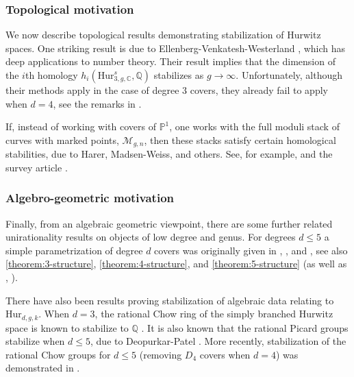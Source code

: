 \documentclass[12 pt]{amsart}
\theoremstyle{plain}
\theoremstyle{definition}
\theoremstyle{remark}
\numberwithin{equation}{section}
\newcommand\bc{\mathbb C}
\newcommand\bp{\mathbb P}
\newcommand\bq{\mathbb Q}
\newcommand\hur[3]{\mathrm{Hur}_{#1,#2,#3}} %
\newcommand\rhur[4]{\mathrm{Hur}_{#1,#2,#3}^{#4}} %
\begin{document}
\subsubsection{Topological motivation}

We now describe topological results demonstrating stabilization of Hurwitz
spaces.
One striking result is due to Ellenberg-Venkatesh-Westerland \cite{EllenbergVW:cohenLenstra}, which has 
deep applications to number theory.
Their result \cite[Thm.\, p. 732]{EllenbergVW:cohenLenstra}
implies that the dimension of the $i$th homology $h_i(\rhur 3 g \bc s, \bq)$
stabilizes as $g \to \infty$.
Unfortunately, although their methods apply in the case of degree $3$ covers,
they already fail to apply when $d= 4$, see the remarks in
\cite[p. 732]{EllenbergVW:cohenLenstra}.

If, instead of working with covers of $\bp^1$, one
works with the full moduli stack of curves with marked points, $\mathcal M_{g,n}$,
then these stacks satisfy certain homological stabilities, due to Harer,
Madsen-Weiss, and others. See, for example,
\cite{madsen-weiss:the-stable-moduli-space-of-riemann-surfaces} and
the survey article
\cite{hatcher:a-short-exposition}.



\subsubsection{Algebro-geometric motivation}

Finally, from an algebraic geometric viewpoint, there are some further related
unirationality results on objects of low degree and genus.
For degrees $d \leq 5$ a simple parametrization of degree $d$ covers
was originally given in \cite[Thm.\ 1.1]{miranda:triple-covers-in-algebraic-geometry},
\cite[ Thm.\ 4.4]{casnatiE:covers-algebraic-varieties}, and \cite[Thm.\
3.8]{casnati:covers-algebraic-varieties-ii},
see also
\autoref{theorem:3-structure},
\autoref{theorem:4-structure}, and
\autoref{theorem:5-structure} (as well as \cite[Prop.\ 5.1]{Poonen2008},
\cite[Thm.\ 1.1]{Wood2011}).

There have also been results proving stabilization 
of algebraic data relating to $\hur d g k$.
When $d = 3$, the rational Chow ring of the simply branched Hurwitz space
is known to stabilize to $\bq$ \cite[Thm.\ C]{patel2015chow}.
It is also known that the rational Picard groups stabilize when
$d \leq 5$, due to Deopurkar-Patel \cite[Thm.\ A]{deopurkarP:the-picard-rank-conjecture}.
More recently, stabilization of the rational Chow groups for $d \leq 5$ 
(removing $D_4$ covers when $d = 4$)
was demonstrated in
\cite[Theorem 1.1]{canningL:chow-rings-of-low-degree-hurwitz-spaces}.
\end{document}
